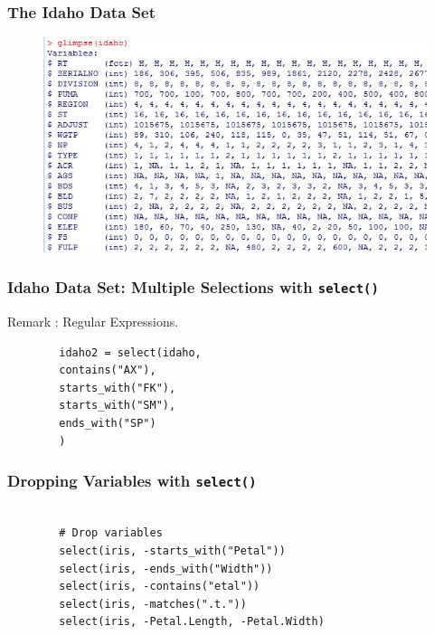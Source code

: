 \documentclass{beamer}
\begin{document}
\begin{frame}[fragile]
	\frametitle{The Idaho Data Set}
	
	\begin{figure}
		\centering
		\includegraphics[width=1.2\linewidth]{images/idahoglimpse}
		
	\end{figure}
	
\end{frame}
\begin{frame}[fragile]
	\frametitle{ Idaho Data Set: Multiple Selections with \texttt{select()} }
	
	Remark : Regular Expressions.
	\begin{framed}
		\begin{verbatim}
		idaho2 = select(idaho,
		contains("AX"),
		starts_with("FK"),
		starts_with("SM"),
		ends_with("SP") 
		)
		\end{verbatim}
	\end{framed}
	
\end{frame}
\begin{frame}[fragile]
	\frametitle{ Dropping Variables with \texttt{select()} }
	\begin{framed}
		\begin{verbatim}	
		
		# Drop variables
		select(iris, -starts_with("Petal"))
		select(iris, -ends_with("Width"))
		select(iris, -contains("etal"))
		select(iris, -matches(".t."))
		select(iris, -Petal.Length, -Petal.Width)
		\end{verbatim}
	\end{framed}
	
\end{frame}
\end{document}
